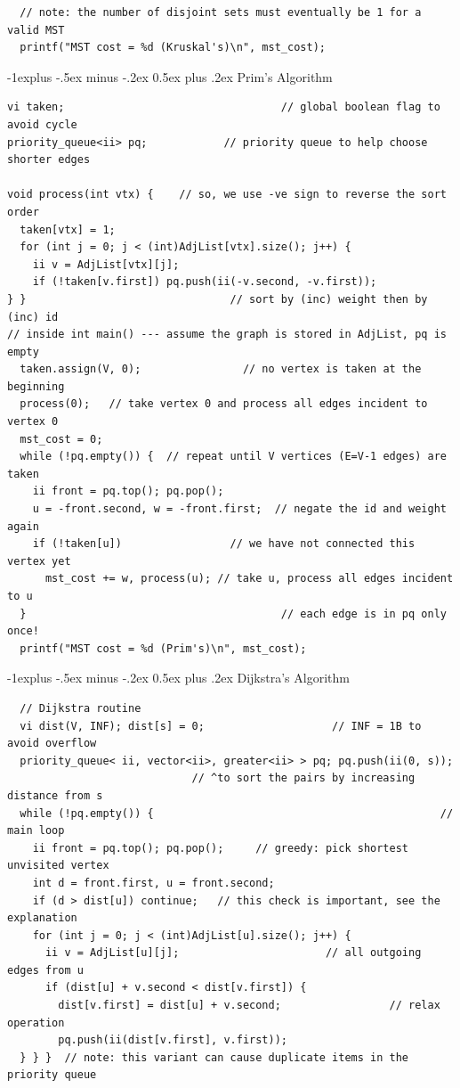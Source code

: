 \documentclass[10pt,landscape]{article}
\makeatletter
\renewcommand{\subsection}{\@startsection{subsection}{2}{0mm}%
                                {-1explus -.5ex minus -.2ex}%
                                {0.5ex plus .2ex}%
                                {\normalfont\normalsize\bfseries}}
\makeatother
\begin{document}
\begin{multicols}{2}
\begin{lstlisting}
  // note: the number of disjoint sets must eventually be 1 for a valid MST
  printf("MST cost = %d (Kruskal's)\n", mst_cost);
\end{lstlisting}

\subsection{Prim's Algorithm}
\begin{lstlisting}
vi taken;                                  // global boolean flag to avoid cycle
priority_queue<ii> pq;            // priority queue to help choose shorter edges

void process(int vtx) {    // so, we use -ve sign to reverse the sort order
  taken[vtx] = 1;
  for (int j = 0; j < (int)AdjList[vtx].size(); j++) {
    ii v = AdjList[vtx][j];
    if (!taken[v.first]) pq.push(ii(-v.second, -v.first));
} }                                // sort by (inc) weight then by (inc) id
// inside int main() --- assume the graph is stored in AdjList, pq is empty
  taken.assign(V, 0);                // no vertex is taken at the beginning
  process(0);   // take vertex 0 and process all edges incident to vertex 0
  mst_cost = 0;
  while (!pq.empty()) {  // repeat until V vertices (E=V-1 edges) are taken
    ii front = pq.top(); pq.pop();
    u = -front.second, w = -front.first;  // negate the id and weight again
    if (!taken[u])                 // we have not connected this vertex yet
      mst_cost += w, process(u); // take u, process all edges incident to u
  }                                        // each edge is in pq only once!
  printf("MST cost = %d (Prim's)\n", mst_cost);
\end{lstlisting}

\subsection{Dijkstra's Algorithm}
\begin{lstlisting}
  // Dijkstra routine
  vi dist(V, INF); dist[s] = 0;                    // INF = 1B to avoid overflow
  priority_queue< ii, vector<ii>, greater<ii> > pq; pq.push(ii(0, s));
                             // ^to sort the pairs by increasing distance from s
  while (!pq.empty()) {                                             // main loop
    ii front = pq.top(); pq.pop();     // greedy: pick shortest unvisited vertex
    int d = front.first, u = front.second;
    if (d > dist[u]) continue;   // this check is important, see the explanation
    for (int j = 0; j < (int)AdjList[u].size(); j++) {
      ii v = AdjList[u][j];                       // all outgoing edges from u
      if (dist[u] + v.second < dist[v.first]) {
        dist[v.first] = dist[u] + v.second;                 // relax operation
        pq.push(ii(dist[v.first], v.first));
  } } }  // note: this variant can cause duplicate items in the priority queue
\end{lstlisting}


\end{multicols}
\end{document}
